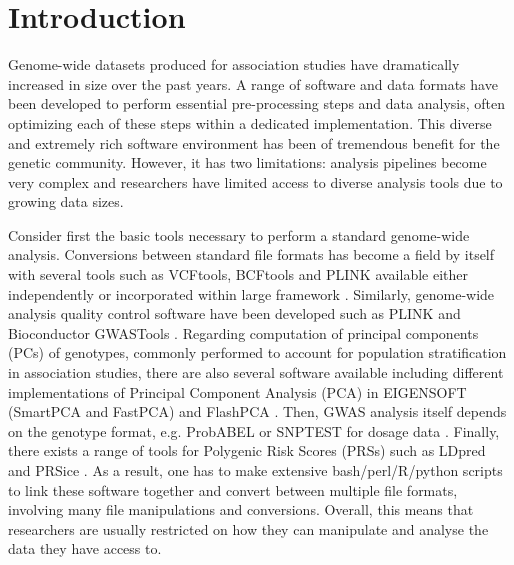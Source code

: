 \documentclass{bioinfo}
\begin{document}
\maketitle

\section{Introduction}

Genome-wide datasets produced for association studies have dramatically increased in size over the past years. A range of software and data formats have been developed to perform essential pre-processing steps and data analysis, often optimizing each of these steps within a dedicated implementation. This diverse and extremely rich software environment has been of tremendous benefit for the genetic community. However, it has two limitations: analysis pipelines become very complex and researchers have limited access to diverse analysis tools due to growing data sizes.

Consider first the basic tools necessary to perform a standard genome-wide analysis. Conversions between standard file formats has become a field by itself with several tools such as VCFtools, BCFtools and PLINK available either independently or incorporated within large framework \cite[]{Danecek2011,Li2011,Purcell2007}. Similarly, genome-wide analysis quality control software have been developed such as PLINK and Bioconductor GWASTools \cite[]{Gogarten2012}. Regarding computation of principal components (PCs) of genotypes, commonly performed to account for population stratification in association studies, there are also several software available including different implementations of Principal Component Analysis (PCA) in EIGENSOFT (SmartPCA and FastPCA) and FlashPCA \cite[]{Price2006,Galinsky2016,Abraham2014a,Abraham2016a}. Then, GWAS analysis itself depends on the genotype format, e.g. ProbABEL or SNPTEST for dosage data \cite[]{Aulchenko2010,Marchini2010}.  Finally, there exists a range of tools for Polygenic Risk Scores (PRSs) such as LDpred and PRSice \cite[]{Vilhjalmsson2015,Euesden2015}. As a result, one has to make extensive bash/perl/R/python scripts to link these software together and convert between multiple file formats, involving many file manipulations and conversions. Overall, this means that researchers are usually restricted on how they can manipulate and analyse the data they have access to. 
\end{document}
